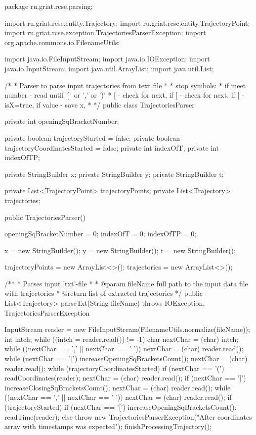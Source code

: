 package ru.griat.rcse.parsing;

import ru.griat.rcse.entity.Trajectory;
import ru.griat.rcse.entity.TrajectoryPoint;
import ru.griat.rcse.exception.TrajectoriesParserException;
import org.apache.commons.io.FilenameUtils;

import java.io.FileInputStream;
import java.io.IOException;
import java.io.InputStream;
import java.util.ArrayList;
import java.util.List;

/*
* Parser to parse input trajectories from text file
* 
* stop symbols:
* if meet number - read until ']' or ',' or ')'
* [ - check for next, if [ - check for next, if [ - isX=true, if value - save x,
* */
public class TrajectoriesParser {
	
	private int openingSqBracketNumber;
	
	private boolean trajectoryStarted = false;
	private boolean trajectoryCoordinatesStarted = false;
	private int indexOfT;
	private int indexOfTP;
	
	private StringBuilder x;
	private StringBuilder y;
	private StringBuilder t;
	
	private List<TrajectoryPoint> trajectoryPoints;
	private List<Trajectory> trajectories;
	
	public TrajectoriesParser() {
		openingSqBracketNumber = 0;
		indexOfT = 0;
		indexOfTP = 0;
		
		x = new StringBuilder();
		y = new StringBuilder();
		t = new StringBuilder();
		
		trajectoryPoints = new ArrayList<>();
		trajectories = new ArrayList<>();
	}

	/**
	* Parses input 'txt'-file
	* 
	* @param fileName  full path to the input data file with trajectories
	* @return          list of extracted trajectories
	*/
	public List<Trajectory> parseTxt(String fileName) throws IOException, TrajectoriesParserException {
		
		InputStream reader = new FileInputStream(FilenameUtils.normalize(fileName));
		int intch;
		while ((intch = reader.read()) != -1) {
			char nextChar = (char) intch;
			while ((nextChar == ',' || nextChar == ' '))
			nextChar = (char) reader.read();
			while (nextChar == '[') {
				increaseOpeningSqBracketsCount();
				nextChar = (char) reader.read();
			}
			while (trajectoryCoordinatesStarted) {
				if (nextChar == '(') {
					readCoordinates(reader);
				}
				nextChar = (char) reader.read();
				if (nextChar == ']') {
					increaseClosingSqBracketsCount();
				}
			}
			nextChar = (char) reader.read();
			while ((nextChar == ',' || nextChar == ' '))
			nextChar = (char) reader.read();
			if (trajectoryStarted) {
				if (nextChar == '[') {
					increaseOpeningSqBracketsCount();
					readTime(reader);
				} else {
					throw new TrajectoriesParserException("After coordinates array with timestamps was expected");
				}
				finishProcessingTrajectory();
			}
		}
		
}}
